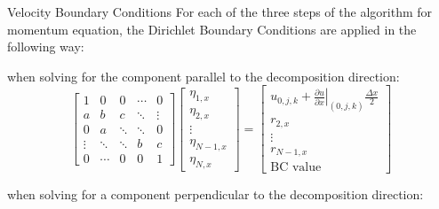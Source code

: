 \begin{frame}[shrink]{Velocity Boundary Conditions}
    For each of the three steps of the algorithm for momentum equation,
    the Dirichlet Boundary Conditions are applied in the following way:

    when solving for the component parallel to the decomposition direction:
    $$
        \begin{bmatrix}
            1      & 0      & 0      & \cdots & 0      \\
            a      & b      & c      & \ddots & \vdots \\
            0      & a      & \ddots & \ddots & 0      \\
            \vdots & \ddots & \ddots & b      & c      \\
            0      & \cdots & 0      & 0      & 1
        \end{bmatrix}
        \begin{bmatrix}
            \eta_{1,x}   \\
            \eta_{2,x}   \\
            \vdots       \\
            \eta_{N-1,x} \\
            \eta_{N,x}
        \end{bmatrix}
        =
        \begin{bmatrix}
            u_{0,j,k} + \left. \frac{\partial u}{\partial x} \right|_{(0,j,k)} \frac{\Delta x}{2} \\
            r_{2,x}                                                                               \\
            \vdots                                                                                \\
            r_{N-1,x}                                                                             \\
            \text{BC value}
        \end{bmatrix}
    $$

    when solving for a component perpendicular to the decomposition direction:


\end{frame}
